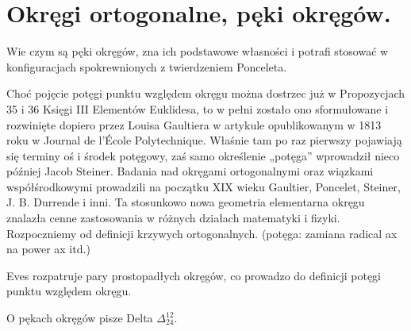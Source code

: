 %

\section{Okręgi ortogonalne, pęki okręgów.}
Wie czym są pęki okręgów, zna ich podstawowe własności i potrafi stosować w konfiguracjach spokrewnionych z twierdzeniem Ponceleta.   

Choć pojęcie potęgi punktu względem okręgu można dostrzec już w Propozycjach 35 i 36 Księgi III Elementów Euklidesa, to w pełni zostało ono sformułowane i rozwinięte dopiero przez Louisa Gaultiera w artykule opublikowanym w 1813 roku w Journal de l'École Polytechnique. Właśnie tam po raz pierwszy pojawiają się terminy oś i środek potęgowy, zaś samo określenie „potęga” wprowadził nieco później Jacob Steiner. Badania nad okręgami ortogonalnymi oraz wiązkami współśrodkowymi prowadzili na początku XIX wieku Gaultier, Poncelet, Steiner, J. B. Durrende i inni. Ta stosunkowo nowa geometria elementarna okręgu znalazła cenne zastosowania w różnych działach matematyki i fizyki. Rozpoczniemy od definicji krzywych ortogonalnych. (potęga: zamiana radical ax na power ax itd.)

Eves \cite[s. 88-90]{eves1_1972} rozpatruje pary prostopadłych okręgów, co prowadzo do definicji potęgi punktu względem okręgu.

O pękach okręgów pisze Delta $\Delta_{24}^{12}$.



%
